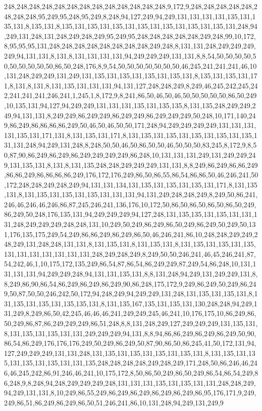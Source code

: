 248,248,248,248,248,248,248,248,248,248,248,248,248,9,172,9,248,248,248,248,248,248,248,248,95,249,95,248,95,249,8,248,94,127,249,94,249,131,131,131,131,135,131,135,131,8,135,131,8,135,131,135,131,135,131,135,131,135,131,135,131,135,131,248,94,249,131,248,131,248,249,248,249,95,249,95,248,248,248,248,248,249,248,99,10,172,8,95,95,95,131,248,248,248,248,248,248,248,248,249,248,8,131,131,248,249,249,249,249,94,131,131,8,131,8,131,131,131,131,94,249,249,249,131,131,8,8,54,50,50,50,50,50,50,50,50,50,50,86,50,248,176,8,9,54,50,50,50,50,50,50,50,46,245,241,241,241,46,10,131,248,249,249,131,249,131,135,131,135,131,135,131,135,131,8,135,131,135,131,171,8,131,8,131,8,131,135,131,131,131,94,131,127,248,248,249,8,249,46,245,242,245,242,241,241,241,246,241,1,245,1,8,172,9,8,241,86,50,46,50,46,50,50,50,50,50,86,50,249,10,135,131,94,127,94,249,249,131,131,131,135,131,135,135,8,131,135,248,249,249,249,94,131,131,8,249,249,86,249,249,86,249,249,86,249,249,249,50,248,10,171,140,249,86,249,86,86,86,86,249,50,46,50,46,50,50,171,248,94,249,249,249,249,131,131,131,131,135,131,171,131,8,131,135,131,171,8,131,135,131,135,131,135,131,135,131,135,131,131,248,94,249,131,248,8,248,50,50,46,50,86,50,50,46,50,50,50,83,245,8,172,9,8,50,87,90,86,249,86,249,86,249,249,249,249,86,248,10,131,131,131,249,131,249,249,249,131,135,131,8,131,8,131,135,248,248,249,249,249,131,131,8,8,249,86,249,86,86,249,86,86,249,86,86,86,86,249,176,172,176,249,86,50,86,55,86,54,86,86,50,46,246,241,50,172,248,248,249,248,249,94,131,131,134,131,135,131,135,131,135,131,171,8,131,135,131,8,131,135,131,135,131,135,131,131,131,94,131,249,248,248,249,8,249,50,86,241,246,46,246,46,246,86,87,245,246,241,136,176,10,172,50,86,50,86,50,86,50,86,50,249,86,249,50,248,176,135,131,94,249,249,249,94,127,248,131,135,135,131,135,131,131,131,248,249,249,249,248,248,131,10,249,50,249,86,249,86,50,249,86,249,50,249,50,131,176,135,175,249,54,249,86,86,249,86,249,86,50,46,246,241,86,10,248,248,249,249,248,249,131,248,248,131,131,8,131,135,131,8,131,135,131,8,131,135,131,135,131,135,131,131,131,131,131,131,131,248,249,248,249,8,249,50,50,246,241,46,45,246,241,87,54,242,46,1,10,175,172,135,249,86,54,87,86,54,86,249,249,87,249,54,86,248,10,131,131,131,131,94,249,249,248,94,131,131,135,131,8,8,131,248,94,249,131,249,249,131,8,8,249,86,90,86,54,86,249,86,249,86,249,90,86,248,175,172,9,249,86,249,50,249,86,249,50,87,50,50,246,242,50,172,94,248,249,94,249,249,131,248,131,135,131,135,131,8,131,135,131,135,131,135,135,131,8,131,135,167,135,131,135,131,130,248,248,94,249,131,249,8,249,86,50,42,245,46,46,46,241,249,249,245,46,241,10,176,175,10,86,249,86,50,249,86,87,86,249,249,249,86,51,248,8,8,131,248,249,127,249,249,249,131,135,131,8,131,135,131,135,131,131,249,249,249,94,131,8,8,94,86,86,249,86,249,86,249,50,90,86,54,86,249,176,176,176,249,50,249,86,249,50,87,90,86,50,86,245,41,50,172,131,94,127,249,249,249,131,131,248,131,135,131,135,131,135,131,135,131,8,131,135,131,135,131,135,131,135,131,131,135,248,248,248,248,249,248,249,171,248,50,86,246,46,246,46,245,242,86,91,246,46,241,10,175,172,8,50,86,50,249,86,50,249,86,54,86,54,249,86,248,9,8,248,94,248,249,249,249,248,131,131,131,135,131,135,131,131,248,248,249,94,249,131,131,8,10,249,86,55,249,86,249,86,249,86,249,86,249,86,95,176,171,9,249,249,86,51,86,249,86,249,86,50,51,246,241,86,10,131,248,94,249,131,249,9